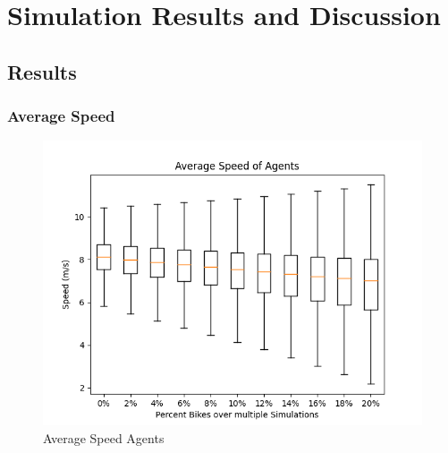 \section{Simulation Results and Discussion}
\subsection{Results} \label{results}


\subsubsection{Average Speed}\label{avg-speed}
\begin{figure}
  \centering
    \vspace{-1.15cm}
  \includegraphics[width=\linewidth]{./figures/avg_speed_agent.png}
  \caption{Average Speed Agents}\label{avg-speed-agents}
\end{figure}


